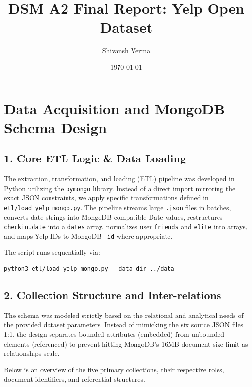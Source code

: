 \documentclass[11pt,a4paper]{article}
\title{\textbf{DSM A2 Final Report: Yelp Open Dataset}}
\author{Shivansh Verma}
\date{\today}
\begin{document}
\maketitle

\tableofcontents
\newpage


\section{Data Acquisition and MongoDB Schema Design}

\subsection*{1. Core ETL Logic \& Data Loading}
The extraction, transformation, and loading (ETL) pipeline was developed in Python utilizing the \texttt{pymongo} library. Instead of a direct import mirroring the exact JSON constraints, we apply specific transformations defined in \texttt{etl/load\_yelp\_mongo.py}. The pipeline streams large \texttt{.json} files in batches, converts date strings into MongoDB-compatible Date values, restructures \texttt{checkin.date} into a \texttt{dates} array, normalizes user \texttt{friends} and \texttt{elite} into arrays, and maps Yelp IDs to MongoDB \texttt{\_id} where appropriate.

The script runs sequentially via:
\begin{verbatim}
python3 etl/load_yelp_mongo.py --data-dir ../data
\end{verbatim}

\subsection*{2. Collection Structure and Inter-relations}
The schema was modeled strictly based on the relational and analytical needs of the provided dataset parameters. Instead of mimicking the six source JSON files 1:1, the design separates bounded attributes (embedded) from unbounded elements (referenced) to prevent hitting MongoDB's 16MB document size limit as relationships scale.

Below is an overview of the five primary collections, their respective roles, document identifiers, and referential structures.
\end{document}
